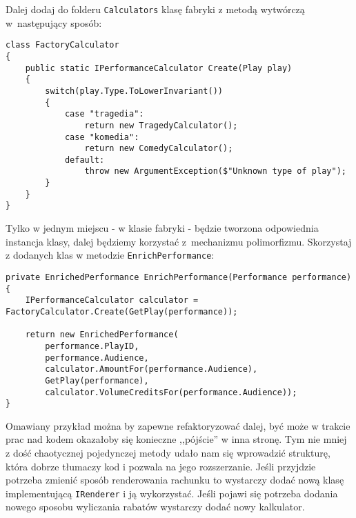 Dalej dodaj do folderu \texttt{Calculators} klasę fabryki z metodą wytwórczą w~następujący sposób:
\begin{lstlisting}
class FactoryCalculator
{
	public static IPerformanceCalculator Create(Play play)
	{
		switch(play.Type.ToLowerInvariant())
		{
			case "tragedia":
				return new TragedyCalculator();
			case "komedia":
				return new ComedyCalculator();
			default:
				throw new ArgumentException($"Unknown type of play");
		}
	}
}
\end{lstlisting}

Tylko w jednym miejscu - w klasie fabryki - będzie tworzona odpowiednia instancja klasy, dalej będziemy korzystać z~mechanizmu polimorfizmu. Skorzystaj z dodanych klas w metodzie \texttt{EnrichPerformance}:
\begin{lstlisting}
private EnrichedPerformance EnrichPerformance(Performance performance)
{
	IPerformanceCalculator calculator = FactoryCalculator.Create(GetPlay(performance));
	
	return new EnrichedPerformance(
		performance.PlayID,
		performance.Audience,
		calculator.AmountFor(performance.Audience),
		GetPlay(performance),
		calculator.VolumeCreditsFor(performance.Audience));
}
\end{lstlisting}

Omawiany przykład można by zapewne refaktoryzować dalej, być może w trakcie prac nad kodem okazałoby się konieczne ,,pójście'' w inna stronę. Tym nie mniej z dość chaotycznej pojedynczej metody udało nam się wprowadzić strukturę, która dobrze tłumaczy kod i pozwala na jego rozszerzanie. Jeśli przyjdzie potrzeba zmienić sposób renderowania rachunku to wystarczy dodać nową klasę implementującą \texttt{IRenderer} i ją wykorzystać. Jeśli pojawi się potrzeba dodania nowego sposobu wyliczania rabatów wystarczy dodać nowy kalkulator.